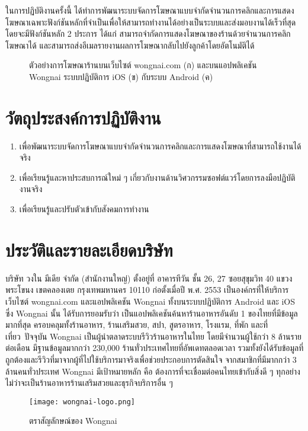 ในการปฏิบัติงานครั้งนี้ ได้ทำการพัฒนาระบบจัดการโฆษณาแบบจำกัดจำนวนการคลิกและการแสดงโฆษณาเฉพาะฟังก์ชันหลักที่จำเป็นเพื่อให้สามารถทำงานได้อย่างเป็นระบบและส่งมอบงานได้เร็วที่สุด โดยจะมีฟังก์ชันหลัก 2 ประการ ได้แก่ สามารถจำกัดการแสดงโฆษณาของร้านด้วยจำนวนการคลิกโฆษณาได้ และสามารถส่งอีเมลรายงานผลการโฆษณากลับไปยังลูกค้าโดยอัตโนมัติได้

\begin{figure}[!p]
	\centering
	\caption{ตัวอย่างการโฆษณาร้านบนเว็บไซต์ wongnai.com (ก) และบนแอปพลิเคชัน Wongnai ระบบปฏิบัติการ iOS (ข) กับระบบ Android (ค)}
	\label{Fig:listingad}
\end{figure}

\section{วัตถุประสงค์การปฏิบัติงาน}
\begin{enumerate}
	\item เพื่อพัฒนาระบบจัดการโฆษณาแบบจำกัดจำนวนการคลิกและการแสดงโฆษณาที่สามารถใช้งานได้จริง
	\item เพื่อเรียนรู้และหาประสบการณ์ใหม่ ๆ เกี่ยวกับงานด้านวิศวกรรมซอฟต์แวร์โดยการลงมือปฏิบัติงานจริง
	\item เพื่อเรียนรู้และปรับตัวเข้ากับสังคมการทำงาน
\end{enumerate}

\section{ประวัติและรายละเอียดบริษัท}
บริษัท วงใน มีเดีย จำกัด (สำนักงานใหญ่) ตั้งอยู่ที่ อาคารทีวัน ชั้น 26, 27 ซอยสุขุมวิท 40 แขวงพระโขนง เขตคลองเตย กรุงเทพมหานคร 10110 ก่อตั้งเมื่อปี พ.ศ. 2553 เป็นองค์กรที่ให้บริการเว็บไซต์ wongnai.com และแอปพลิเคชัน Wongnai ทั้งบนระบบปฏิบัติการ Android และ iOS ซึ่ง Wongnai นั้น ได้รับการยอมรับว่า เป็นแอปพลิเคชันค้นหาร้านอาหารอันดับ 1 ของไทยที่มีข้อมูลมากที่สุด ครอบคลุมทั้งร้านอาหาร, ร้านเสริมสวย, สปา, สูตรอาหาร, โรงแรม, ที่พัก และที่เที่ยว ปัจจุบัน Wongnai เป็นผู้นำตลาดระบบรีวิวร้านอาหารในไทย โดยมีจำนวนผู้ใช้กว่า 8 ล้านรายต่อเดือน มีฐานข้อมูลมากกว่า 230,000 ร้านทั่วประเทศไทยที่อัพเดทตลอดเวลา รวมทั้งยังได้รับข้อมูลที่ถูกต้องและรีวิวที่มาจากผู้ที่ไปใช้บริการมาจริงเพื่อช่วยประกอบการตัดสินใจ จากสมาชิกที่มีมากกว่า 3 ล้านคนทั่วประเทศ Wongnai มีเป้าหมายหลัก คือ ต้องการที่จะเชื่อมต่อคนไทยเข้ากับสิ่งดี ๆ ทุกอย่างไม่ว่าจะเป็นร้านอาหารร้านเสริมสวยและธุรกิจบริการอื่น ๆ

\begin{figure}[!h]
	\centering
	\texttt{[image: wongnai-logo.png]}  
	\caption{ตราสัญลักษณ์ของ Wongnai}
	\label{Fig:wongnai-logo}
\end{figure}